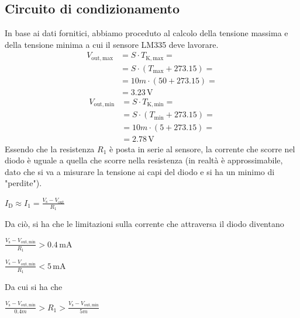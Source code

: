 \documentclass[a4paper]{article}
\begin{document}
		\subsection{Circuito di condizionamento}
			In base ai dati fornitici, abbiamo proceduto al calcolo della tensione massima e della tensione minima a cui il sensore LM335 deve lavorare.
			\begin{equation*}
				\begin{split}
					V_{\mathrm{out, max}} &= S \cdot T_{\mathrm{K, max}} = \\
										  &= S \cdot (T_{\mathrm{max}} + 273.15) = \\
										  &= 10m \cdot (50 + 273.15) = \\
										  &= 3.23 \, \mathrm{V}
				\end{split}
			\end{equation*}
			\begin{equation*}
				\begin{split}
					V_{\mathrm{out, min}} &= S \cdot T_{\mathrm{K, min}} = \\
										  &= S \cdot (T_{\mathrm{min}} + 273.15) = \\
										  &= 10m \cdot (5 + 273.15) = \\
										  &= 2.78 \, \mathrm{V}
				\end{split}
			\end{equation*}
			Essendo che la resistenza $ R_{1} $ è posta in serie al sensore, la corrente che scorre nel diodo è uguale a quella che scorre nella resistenza (in realtà è approssimabile, dato che si va a misurare la tensione ai capi del diodo e si ha un minimo di "perdite").
			\begin{center}
				$ I_{\mathrm{D}} \approx I_{1} = \frac{V_{\mathrm{s}} - V_{\mathrm{out}}}{R_{1}} $
			\end{center}
			Da ciò, si ha che le limitazioni sulla corrente che attraversa il diodo diventano
			\begin{center}
				$ \frac{V_{\mathrm{s}} - V_{\mathrm{out, min}}}{R_{1}} > 0.4 \, \mathrm{mA} $
			\end{center}
			\begin{center}
				$ \frac{V_{\mathrm{s}} - V_{\mathrm{out, min}}}{R_{1}} < 5 \, \mathrm{mA} $
			\end{center}
			Da cui si ha che
			\begin{center}
				$ \frac{V_{\mathrm{s}} - V_{\mathrm{out, min}}}{0.4m} > R_{1} > \frac{V_{\mathrm{s}} - V_{\mathrm{out, min}}}{5m} $
			\end{center}
\end{document}
